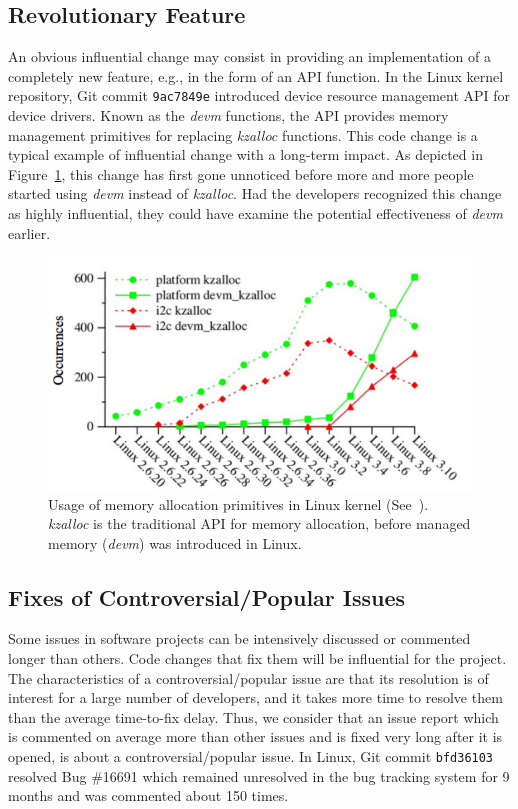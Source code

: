 \subsection{Revolutionary Feature}

An obvious influential change may consist in providing an implementation of
a completely new feature, e.g., in the form of an API function.
In the Linux kernel repository, Git commit {\tt 9ac7849e} introduced device resource management
API for device drivers. Known as the {\em devm} functions, the API
provides memory management primitives for replacing {\em kzalloc} functions.
This code change is a typical example of influential change with a long-term impact.
As depicted in Figure~\ref{fig:devm}, this change has first gone unnoticed
before more and more people started using {\em devm} instead of {\em kzalloc}.
Had the developers recognized this change as highly influential, they could have examine the potential effectiveness of {\em devm} earlier.



\begin{figure}[!h]%
    \centering
    \includegraphics[width=0.6\linewidth]{fig/devm}
    \caption{Usage of memory allocation primitives in Linux kernel (See~\cite{recipes_devm}). {\em kzalloc} is the traditional API for memory allocation,
before managed memory ({\em devm}) was introduced in Linux.}
    \label{fig:devm}
\end{figure}


\subsection{Fixes of Controversial/Popular Issues}
Some issues in software projects can be intensively discussed or commented longer than others.
Code changes that fix them will be influential for the project. The characteristics of a controversial/popular issue
are that its resolution is of interest for a large number of developers, and it takes more time
to resolve them than the average time-to-fix delay. Thus, we consider that an issue report
which is commented on average more than other issues and is fixed very long after it
is opened, is about a controversial/popular issue. In Linux, Git commit {\tt bfd36103}
resolved Bug \#16691 which remained unresolved in the bug tracking system for 9 months
and was commented about 150 times.
